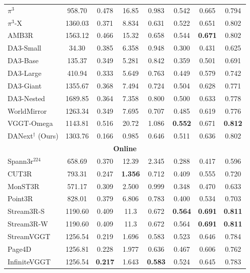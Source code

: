 \begin{table}[t]
{\begin{tabular}{l c >{\columncolor{subcol}}c >{\columncolor{subcol}}c >{\columncolor{subcol}}c >{\columncolor{subcol}}c >{\columncolor{subcol}}c >{\columncolor{subcol}}c}
 $\pi^{3}$ & 958.70 & 0.478 & 16.85 & 0.983 & 0.542 & 0.665 & 0.794 \\
 $\pi^{3}$-X & 1360.03 & 0.371 & 8.834 & 0.631 & 0.522 & 0.651 & 0.802 \\
 AMB3R & 1563.12 & 0.466 & 15.32 & 0.658 & 0.544 & \cellcolor{secondorange}\textbf{0.671} & 0.802 \\
 DA3-Small & 34.30 & 0.385 & 6.358 & 0.948 & 0.300 & 0.431 & 0.625 \\
 DA3-Base & 135.37 & 0.349 & 5.281 & 0.842 & 0.359 & 0.501 & 0.691 \\
 DA3-Large & 410.94 & 0.333 & 5.649 & 0.763 & 0.449 & 0.579 & 0.742 \\
 DA3-Giant & 1355.67 & 0.368 & 7.494 & 0.724 & 0.504 & 0.628 & 0.771 \\
 DA3-Nested & 1689.85 & 0.364 & 7.358 & 0.800 & 0.500 & 0.633 & 0.778 \\
 WorldMirror & 1263.34 & 0.349 & 7.695 & 0.707 & 0.485 & 0.619 & 0.776 \\
 VGGT-Omega & 1143.81 & 0.516 & 20.72 & 1.086 & \cellcolor{thirdyellow}\textbf{0.552} & \cellcolor{thirdyellow}0.671 & \cellcolor{bestred}\textbf{0.812} \\ \hdashline
 DANext$^{\dagger}$ (Ours) & 1303.76 & 0.166 & 0.985 & 0.646 & 0.511 & 0.636 & 0.802 \\
\midrule
\multicolumn{8}{c}{\cellcolor{catgray}\textbf{Online}} \\
\midrule
 Spann3r$^{224}$ & 658.69 & 0.370 & 12.39 & 2.345 & 0.288 & 0.417 & 0.596 \\
 CUT3R & 793.31 & 0.247 & \textbf{1.356} & 0.712 & 0.409 & 0.555 & 0.720 \\
 MonST3R & 571.17 & 0.309 & 2.500 & 0.999 & 0.348 & 0.470 & 0.633 \\
 Point3R & 828.01 & 0.379 & 6.806 & 0.783 & 0.400 & 0.534 & 0.703 \\
 Stream3R-S & 1190.60 & 0.409 & 11.3 & 0.672 & \cellcolor{bestred}\textbf{0.564} & \cellcolor{bestred}\textbf{0.691} & \cellcolor{secondorange}\textbf{0.811} \\
 Stream3R-W & 1190.60 & 0.409 & 11.3 & 0.672 & \cellcolor{secondorange}0.564 & \cellcolor{bestred}\textbf{0.691} & \cellcolor{secondorange}\textbf{0.811} \\
 StreamVGGT & 1256.54 & 0.219 & 1.696 & \cellcolor{secondorange}0.583 & 0.523 & 0.646 & 0.784 \\
 Page4D & 1256.81 & 0.228 & 1.977 & 0.636 & 0.467 & 0.606 & 0.762 \\
 InfiniteVGGT & 1256.54 & \textbf{0.217} & 1.643 & \cellcolor{bestred}\textbf{0.583} & 0.524 & 0.645 & 0.783 \\

\end{tabular}}
\end{table}
